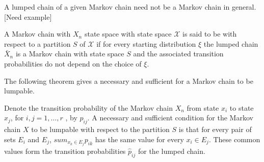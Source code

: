\documentclass[12pt]{article}
\begin{document}
A lumped chain of a given Markov chain need not be a Markov chain in
general. [Need example]

\begin{definition}
  A Markov chain with $X_n$ state space with state space $\mathcal{X}$
  is said to be  with respect to a partition $S$ of
  $\mathcal{X}$ if for every starting distribution \( \xi \) the lumped chain \(
  \bar{X}_n \) is a Markov chain with state space $S$ and the
  associated transition probabilities do not depend on the choice of
  $\xi$.  
\end{definition}

The following theorem gives a necessary and sufficient for a Markov
chain to be lumpable.

\begin{theorem}
Denote the transition probability
of the Markov chain $X_n$ from state $x_i$ to state $x_j$, for \( i, j
= 1, \dots,  r\) , by \( p_{ij} \).  A 
necessary and sufficient condition for the Markov chain $X$ to be lumpable
with respect to the partition $S$ is that for every pair of sets
$E_i$ and $E_j$, \( sum_{x_k \in E_j} p_{ik} \) has the
same value for every \(x_i \in E_j \). These common values form
the transition probabilities $\hat{p}_{ij}$ for the lumped chain.
\end{theorem}
\end{document}
